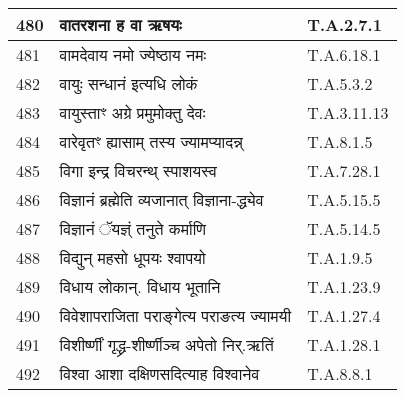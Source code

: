 \documentclass[17pt]{extarticle}
\begin{document}
\begin{longtable}{||p{0.4in}||p{4.9in}||p{0.9in}||}
    \hline
        
    480 & वातरशना ह वा ऋषयः & T.A.2.7.1       \\
    
    \hline
        
    481 & वामदेवाय नमो ज्येष्ठाय नमः & T.A.6.18.1       \\
    
    \hline
        
    482 & वायुः सन्धानं इत्यधि लोकं & T.A.5.3.2       \\
    
    \hline
        
    483 & वायुस्ताꣳ अग्रे प्रमुमोक्तु देवः & T.A.3.11.13       \\
    
    \hline
        
    484 & वारेवृतꣳ ह्यासाम् तस्य ज्यामप्यादन्न् & T.A.8.1.5       \\
    
    \hline
        
    485 & विगा इन्द्र विचरन्थ् स्पाशयस्व & T.A.7.28.1       \\
    
    \hline
        
    486 & विज्ञानं ब्रह्मेति व्यजानात् विज्ञाना{-}द्ध्येव & T.A.5.15.5       \\
    
    \hline
        
    487 & विज्ञानं ॅयज्ञ्ं तनुते कर्माणि & T.A.5.14.5       \\
    
    \hline
        
    488 & विद्युन् महसो धूपयः श्वापयो & T.A.1.9.5       \\
    
    \hline
        
    489 & विधाय लोकान्. विधाय भूतानि & T.A.1.23.9       \\
    
    \hline
        
    490 & विवेशापराजिता पराङ्गेत्य पराङत्य ज्यामयी & T.A.1.27.4       \\
    
    \hline
        
    491 & विशीर्ष्णीं गृद्ध्र{-}शीर्ष्णीञ्च अपेतो निर्.ऋतिं & T.A.1.28.1       \\
    
    \hline
        
    492 & विश्वा आशा दक्षिणसदित्याह विश्वानेव & T.A.8.8.1       \\
    

\end{longtable}
\end{document}
